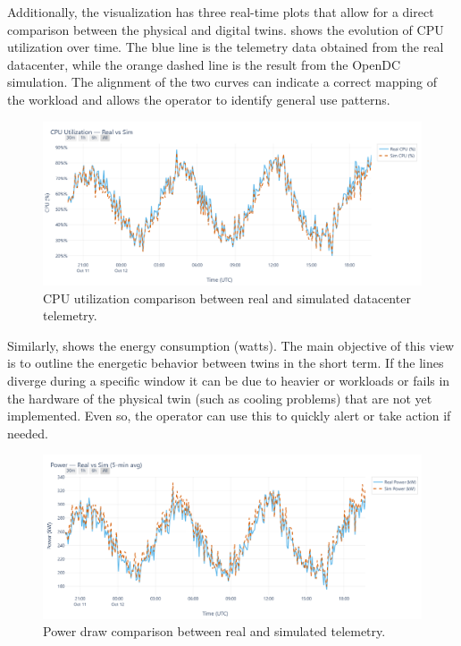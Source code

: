 Additionally, the visualization has three real-time plots that allow for a direct comparison between the physical and digital twins.  shows the evolution of CPU utilization over time. The blue line is the telemetry data obtained from the real datacenter, while the orange dashed line is the result from the OpenDC simulation. The alignment of the two curves can indicate a correct mapping of the workload and allows the operator to identify general use patterns.

\begin{figure}[t]
    \centering
    \includegraphics[width=\linewidth]{figures/cpu_plot.png}
    \caption{CPU utilization comparison between real and simulated datacenter telemetry.}
    \label{fig:cpu_plot}
\end{figure}

Similarly,  shows the energy consumption (watts). The main objective of this view is to outline the energetic behavior between twins in the short term. If the lines diverge during a specific window it can be due to heavier or workloads or fails in the hardware of the physical twin (such as cooling problems) that are not yet implemented. Even so, the operator can use this to quickly alert or take action if needed.

\begin{figure}[t]
    \centering
    \includegraphics[width=\linewidth]{figures/power_plot.png}
    \caption{Power draw comparison between real and simulated telemetry.}
    \label{fig:power_plot}
\end{figure}

